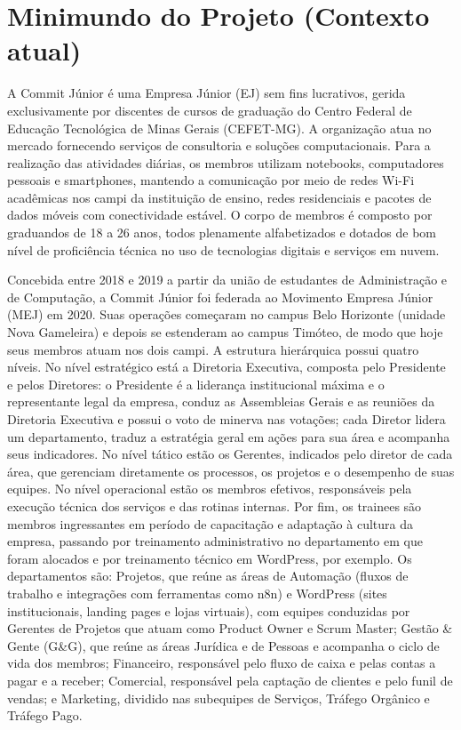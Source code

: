 \chapter{Minimundo do Projeto (Contexto atual)}
\label{cap:minimundo}

A Commit Júnior é uma Empresa Júnior (EJ) sem fins lucrativos, gerida exclusivamente por discentes de cursos de graduação do Centro Federal de Educação Tecnológica de Minas Gerais (CEFET-MG). A organização atua no mercado fornecendo serviços de consultoria e soluções computacionais. Para a realização das atividades diárias, os membros utilizam notebooks, computadores pessoais e smartphones, mantendo a comunicação por meio de redes Wi-Fi acadêmicas nos campi da instituição de ensino, redes residenciais e pacotes de dados móveis com conectividade estável. O corpo de membros é composto por graduandos de 18 a 26 anos, todos plenamente alfabetizados e dotados de bom nível de proficiência técnica no uso de tecnologias digitais e serviços em nuvem.

Concebida entre 2018 e 2019 a partir da união de estudantes de Administração e de Computação, a Commit Júnior foi federada ao Movimento Empresa Júnior (MEJ) em 2020. Suas operações começaram no campus Belo Horizonte (unidade Nova Gameleira) e depois se estenderam ao campus Timóteo, de modo que hoje seus membros atuam nos dois campi. A estrutura hierárquica possui quatro níveis. No nível estratégico está a Diretoria Executiva, composta pelo Presidente e pelos Diretores: o Presidente é a liderança institucional máxima e o representante legal da empresa, conduz as Assembleias Gerais e as reuniões da Diretoria Executiva e possui o voto de minerva nas votações; cada Diretor lidera um departamento, traduz a estratégia geral em ações para sua área e acompanha seus indicadores. No nível tático estão os Gerentes, indicados pelo diretor de cada área, que gerenciam diretamente os processos, os projetos e o desempenho de suas equipes. No nível operacional estão os membros efetivos, responsáveis pela execução técnica dos serviços e das rotinas internas. Por fim, os trainees são membros ingressantes em período de capacitação e adaptação à cultura da empresa, passando por treinamento administrativo no departamento em que foram alocados e por treinamento técnico em WordPress, por exemplo. Os departamentos são: Projetos, que reúne as áreas de Automação (fluxos de trabalho e integrações com ferramentas como n8n) e WordPress (sites institucionais, landing pages e lojas virtuais), com equipes conduzidas por Gerentes de Projetos que atuam como Product Owner e Scrum Master; Gestão \& Gente (G\&G), que reúne as áreas Jurídica e de Pessoas e acompanha o ciclo de vida dos membros; Financeiro, responsável pelo fluxo de caixa e pelas contas a pagar e a receber; Comercial, responsável pela captação de clientes e pelo funil de vendas; e Marketing, dividido nas subequipes de Serviços, Tráfego Orgânico e Tráfego Pago.

